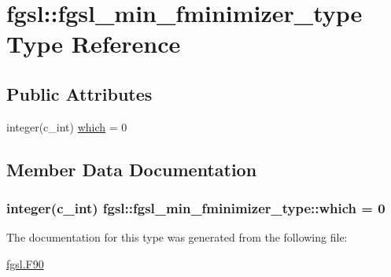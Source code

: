 \hypertarget{structfgsl_1_1fgsl__min__fminimizer__type}{}\section{fgsl\+:\+:fgsl\+\_\+min\+\_\+fminimizer\+\_\+type Type Reference}
\label{structfgsl_1_1fgsl__min__fminimizer__type}
\subsection*{Public Attributes}
\begin{DoxyCompactItemize}
\item 
integer(c\+\_\+int) \hyperlink{structfgsl_1_1fgsl__min__fminimizer__type_a0f03f3712470d4423576f60468717637}{which} = 0
\end{DoxyCompactItemize}


\subsection{Member Data Documentation}
\hypertarget{structfgsl_1_1fgsl__min__fminimizer__type_a0f03f3712470d4423576f60468717637}{}
\subsubsection[{which}]{\setlength{\rightskip}{0pt plus 5cm}integer(c\+\_\+int) fgsl\+::fgsl\+\_\+min\+\_\+fminimizer\+\_\+type\+::which = 0}\label{structfgsl_1_1fgsl__min__fminimizer__type_a0f03f3712470d4423576f60468717637}


The documentation for this type was generated from the following file\+:\begin{DoxyCompactItemize}
\item 
\hyperlink{fgsl_8F90}{fgsl.\+F90}\end{DoxyCompactItemize}
